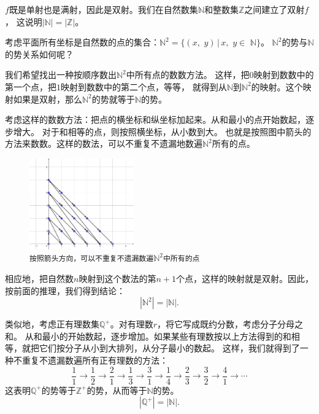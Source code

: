 \documentclass[12pt,UTF8]{ctexbook}
\theoremstyle{definition}
\theoremstyle{plain}
\begin{document}
$f$既是单射也是满射，因此是双射。我们在自然数集$\mathbb{N}$和整数集$\mathbb{Z}$之间建立了双射$f$，
这说明$|\mathbb{N}| = |\mathbb{Z}|$。

考虑平面所有坐标是自然数的点的集合：$\mathbb{N}^2 = \{(x,\,\,y) \, | \, x, \,\, y \in \,\, \mathbb{N}\}$。
$\mathbb{N}^2$的势与$\mathbb{N}$的势关系如何呢？

我们希望找出一种按顺序数出$\mathbb{N}^2$中所有点的数数方法。
这样，把$0$映射到数数中的第一个点，把$1$映射到数数中的第二个点，等等，
就得到从$\mathbb{N}$到$\mathbb{N}^2$的映射。这个映射如果是双射，那么$\mathbb{N}^2$的势就等于$\mathbb{N}$的势。

考虑这样的数数方法：把点的横坐标和纵坐标加起来。从和最小的点开始数起，逐步增大。
对于和相等的点，则按照横坐标，从小数到大。
也就是按照图中箭头的方法来数数。这样的数法，可以不重复不遗漏地数遍$\mathbb{N}^2$所有的点。

\begin{figure}[h] %
    \vspace{4pt}
    \centering
    \includegraphics[width=0.4\textwidth]{tu/无穷1.png}
    \caption*{\texttt{按照箭头方向，可以不重复不遗漏数遍}$\mathbb{N}^2$\texttt{中所有的点}}
\end{figure}

相应地，把自然数$n$映射到这个数法的第$n+1$个点，这样的映射就是双射。因此，按前面的推理，我们得到结论：
$$ |\mathbb{N}^2| = |\mathbb{N}|.$$

类似地，考虑正有理数集$\mathbb{Q}^+$。对有理数$r$，将它写成既约分数，考虑分子分母之和。
从和最小的开始数起，逐步增加。如果某些有理数按以上方法得到的和相等，就把它们按分子从小到大排列，从分子最小的数起。
这样，我们就得到了一种不重复不遗漏数遍所有正有理数的方法：
$$ \frac{1}{1} \rightarrow \frac{1}{2} \rightarrow \frac{2}{1} \rightarrow \frac{1}{3} \rightarrow \frac{3}{1} \rightarrow \frac{1}{4} \rightarrow \frac{2}{3} \rightarrow \frac{3}{2} \rightarrow \frac{4}{1} \rightarrow \cdots$$
这表明$\mathbb{Q}^+$的势等于$\mathbb{Z}^+$的势，从而等于$\mathbb{N}$的势。
$$ |\mathbb{Q}^+| = |\mathbb{N}|.$$
\end{document}
